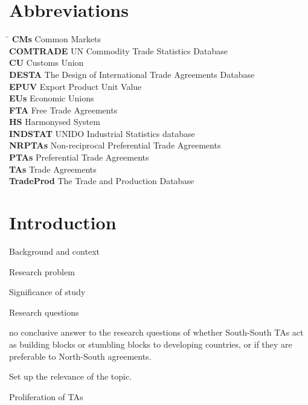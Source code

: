 \documentclass[12pt]{article}%
\begin{document}
\section*{Abbreviations}%
\label{sec:Abbreviations}%
\begin{tabbing}%
\hspace{3cm} \= \kill%
\textbf{CMs} \> Common Markets \\%
\textbf{COMTRADE} \> UN Commodity Trade Statistics Database \\%
\textbf{CU} \> Customs Union \\%
\textbf{DESTA} \> The Design of International Trade Agreements Database \\%
\textbf{EPUV} \> Export Product Unit Value \\%
\textbf{EUs} \> Economic Unions \\%
\textbf{FTA} \> Free Trade Agreements \\%
\textbf{HS} \> Harmonysed System \\%
\textbf{INDSTAT } \> UNIDO Industrial Statistics database \\%
\textbf{NRPTAs} \> Non-reciprocal Preferential Trade Agreements \\%
\textbf{PTAs} \> Preferential Trade Agreements \\%
\textbf{TAs} \> Trade Agreements \\%
\textbf{TradeProd} \> The Trade and Production Database \\%
\end{tabbing}

%
\newpage%
\listoffigures%
\newpage%
\listoftables%
\newpage%
%
\pagestyle{mainmatter}%
\section{Introduction}%
\label{sec:Introduction}%
Background and context

Research problem

Significance of study

Research questions

no conclusive answer to the research questions of whether South-South
TAs act as building blocks or stumbling blocks to developing countries,
or if they are preferable to North-South agreements.

Set up the relevance of the topic.

Proliferation of TAs
\end{document}

